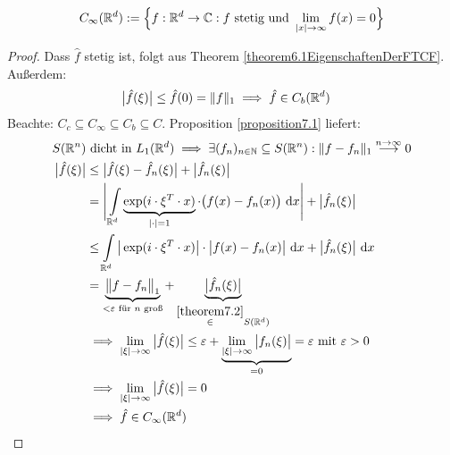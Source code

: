 \begin{bemerkung}
\begin{align*}
C_\infty(\mathbb{R}^d):=\Big\lbrace f:\mathbb{R}^d\to\mathbb{C}: f\text{ stetig und }\lim\limits_{|x|\to\infty}f(x)=0\Big\rbrace
\end{align*}
\end{bemerkung}

\begin{proof}
Dass $\hat{f}$ stetig ist, folgt aus Theorem \ref{theorem6.1EigenschaftenDerFTCF}. Außerdem:
\begin{align*}
\big|\hat{f}(\xi)\big|
&\leq\hat{f}(0)=\Vert f\Vert_1\implies\hat{f}\in C_b(\mathbb{R}^d)
\end{align*}
Beachte: $C_c\subseteq C_\infty\subseteq C_b\subseteq C$.
Proposition \ref{proposition7.1} liefert:
\begin{align*}
S(\mathbb{R}^n)&\text{ dicht in }L_1(\mathbb{R}^d)\implies\exists(f_n)_{n\in\mathbb{N}}\subseteq S(\mathbb{R}^n):\Vert f-f_n\Vert_1\stackrel{n\to\infty}{\longrightarrow}0\\
\big|\hat{f}(\xi)\big|
&\leq\big|\hat{f}(\xi)-\hat{f}_n(\xi)\big|+\big|\hat{f}_n(\xi)\big|\\
&=\Bigg|\int\limits_{\mathbb{R}^d}\underbrace{\exp(i\cdot\xi^T\cdot x)}_{|\cdot|=1}\cdot\big(f(x)-f_n(x)\big)\text{ d} x\Bigg|+\big|\hat{f}_n(\xi)\big|\\
&\leq
\int\limits_{\mathbb{R}^d}\big|\exp(i\cdot\xi^T\cdot x)\big|\cdot\big|f(x)-f_n(x)\big|\text{ d} x+\big|\hat{f}_n(\xi)\big|\text{ d} x\\
&=\underbrace{\big\Vert f-f_n\big\Vert_1}_{<\varepsilon\text{ für $n$ groß}}+\underbrace{\big|\hat{f}_n(\xi)\big|}_{\stackrel{\ref{theorem7.2}}{\in} S(\mathbb{R}^d)}\\
&\implies
\lim\limits_{|\xi|\to\infty}\big|\hat{f}(\xi)\big|\leq\varepsilon+\underbrace{\lim\limits_{|\xi|\to\infty}\big|f_n(\xi)\big|}_{=0}=\varepsilon\text{ mit }\varepsilon>0\\
&\implies\lim\limits_{|\xi|\to\infty}\big|\hat{f}(\xi)\big|=0\\
&\implies\hat{f}\in C_\infty(\mathbb{R}^d)
\end{align*}
\end{proof}



